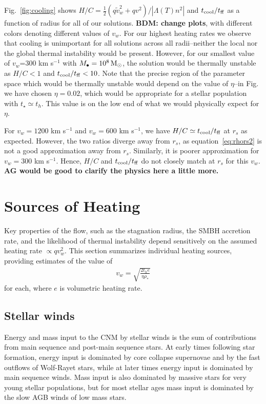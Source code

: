 \documentclass[usenatbib,fleqn]{mn2e}
\newcommand{\rs}{r_s}
\newcommand{\vw}{\tilde{v}_{w}}
\newcommand{\rhostar}{\rho_*}
\newcommand{\Mbh}[1][]{M_{\bullet#1}}
\newcommand{\vwO}{v_{w}}
\newcommand{\tage}{t_{\star}}
\renewcommand{\th}{t_h}
\newcommand{\tcool}{t_{\rm cool}}
\newcommand{\tff}{t_{\rm ff}}
\begin{document}
Fig.~\ref{fig:cooling} shows $H/C=\frac{1}{2} (q \vw^2+q
v^2)/\left|\Lambda(T) n^2\right|$ and $\tcool/\tff$
as a function of radius for all of our solutions. {\bf BDM: change
  plots}, with different colors denoting different values of $\vwO$.
For our highest heating rates we observe that cooling is unimportant
for all solutions across all radii--neither the local nor the global
thermal instability would be present. However,  for our smallest value
of $\vwO$=300 km s$^{-1}$ with $\Mbh=10^8 \Msun$, the solution would be
thermally unstable as $H/C<1$ and $\tcool/\tff<10$. Note that the
precise region of the parameter space which would be thermally
unstable would depend on the value of $\eta$--in
Fig.~\pageref{fig:cooling} we have chosen $\eta=0.02$, which would be
appropriate for a stellar population with $\tage\simeq \th$. This
value is on the low end of what we would physically expect for
$\eta$. 

For $\vwO=1200$ km s$^{-1}$ and $\vwO=600$ km s$^{-1}$, we have
$H/C\simeq\tcool/\tff$ at $\rs$ as expected. However, the two ratios
diverge away from $\rs$, as equation~\eqref{eq:rhors2} is not a good
approximation away from $\rs$. Similarly, it is poorer approximation
for $\vwO=300$ km s$^{-1}$. Hence, $H/C$ and $\tcool/\tff$ do not
closely match at $\rs$ for this $\vwO$. {\bf AG would be good to
  clarify the physics here a little more.}

\section{Sources of Heating}
\label{sec:heating}

Key properties of the flow, such as the stagnation radius, the SMBH accretion rate, and the likelihood of thermal instability depend sensitively on the assumed heating rate $\propto qv_{w}^{2}$.  This section summarizes individual heating sources, providing estimates of the value of
\begin{align}
  v_{w} = \sqrt{\frac{2 t_h e}{\eta \rhostar}}
  \label{eq:vw_eff}
\end{align}
for each, where $e$ is volumetric heating rate.  

\subsection{Stellar winds} 

Energy and mass input to the CNM by stellar winds is the sum of contributions from main sequence and post-main sequence stars.  At early times following star formation, energy input is dominated by core collapse supernovae and by the fast outflows of Wolf-Rayet stars, while at later times energy input is dominated by main sequence winds.  Mass input is also dominated by massive stars for very young stellar populations, but for most stellar ages mass input is dominated by the slow AGB winds of low mass stars.  
\end{document}

